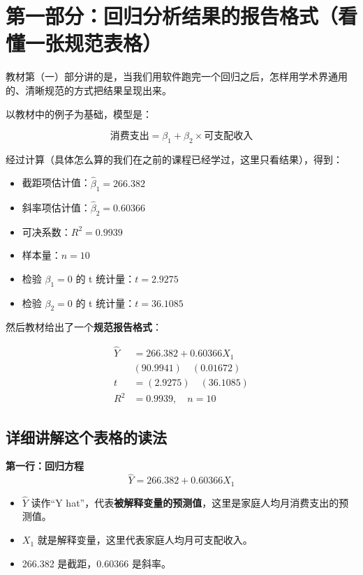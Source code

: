 \documentclass[12pt,a4paper]{article}
\begin{document}
\section*{第一部分：回归分析结果的报告格式（看懂一张规范表格）}

教材第（一）部分讲的是，当我们用软件跑完一个回归之后，怎样用学术界通用的、清晰规范的方式把结果呈现出来。

以教材中的例子为基础，模型是：

\[
\text{消费支出} = \beta_1 + \beta_2 \times \text{可支配收入}
\]

经过计算（具体怎么算的我们在之前的课程已经学过，这里只看结果），得到：

\begin{itemize}
\item 截距项估计值：\(\hat{\beta}_1 = 266.382\)
\item 斜率项估计值：\(\hat{\beta}_2 = 0.60366\)
\item 可决系数：\(R^2 = 0.9939\)
\item 样本量：\(n = 10\)
\item 检验 \(\beta_1=0\) 的 t 统计量：\(t = 2.9275\)
\item 检验 \(\beta_2=0\) 的 t 统计量：\(t = 36.1085\)
\end{itemize}

然后教材给出了一个\textbf{规范报告格式}：

\[
\begin{aligned}
\hat{Y} &= 266.382 + 0.60366 X_1 \\
&(90.9941) \quad (0.01672) \\
t &= (2.9275) \quad (36.1085) \\
R^2 &= 0.9939, \quad n = 10
\end{aligned}
\]

\subsection*{详细讲解这个表格的读法}

\textbf{第一行：回归方程}
\[
\hat{Y} = 266.382 + 0.60366 X_1
\]
\begin{itemize}
\item \(\hat{Y}\) 读作“Y hat”，代表\textbf{被解释变量的预测值}，这里是家庭人均月消费支出的预测值。
\item \(X_1\) 就是解释变量，这里代表家庭人均月可支配收入。
\item 266.382 是截距，0.60366 是斜率。
\end{itemize}
\end{document}
